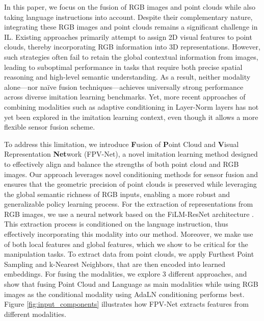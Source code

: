 In this paper, we focus on the fusion of RGB images and point clouds while also taking language instructions into account. Despite their complementary nature, integrating these RGB images and point clouds remains a significant challenge in IL. Existing approaches \cite{gervet2023act3d, shridhar2023perceiver, ze20243d} primarily attempt to assign 2D visual features to point clouds, thereby incorporating RGB information into 3D representations. However, such strategies often fail to retain the global contextual information from images, leading to suboptimal performance in tasks that require both precise spatial reasoning and high-level semantic understanding. As a result, neither modality alone—nor naïve fusion techniques—achieves universally strong performance across diverse imitation learning benchmarks. Yet, more recent approaches of combining modalities such as adaptive conditioning in Layer-Norm layers \cite{Peebles2022DiT} has not yet been explored in the imitation learning context, even though it allows a more flexible sensor fusion scheme. 



To address this limitation, we introduce \textbf{F}usion of \textbf{P}oint Cloud and \textbf{V}isual Representation \textbf{Net}work (FPV-Net), a novel imitation learning method designed to effectively align and balance the strengths of both point cloud and RGB images. Our approach leverages novel conditioning methods for sensor fusion \cite{Peebles2022DiT} and ensures that the geometric precision of point clouds is preserved while leveraging the global semantic richness of RGB inputs, enabling a more robust and generalizable policy learning process.
For the extraction of representations from RGB images, we use a neural network based on the FiLM-ResNet architecture \cite{perez2018film}. This extraction process is conditioned on the language instruction, thus effectively incorporating this modality into our method. Moreover, we make use of both local features and global features, which we show to be critical for the manipulation tasks. 
To extract data from point clouds, we apply Furthest Point Sampling \cite{eldar1994farthest} and k-Nearest Neighbors, that are then encoded into learned embeddings.  For fusing the modalities, we explore 3 different approaches, and show that fusing Point Cloud and Language as main modalities while using RGB images as the conditional modality using AdaLN conditioning \cite{Peebles2022DiT} performs best. Figure \ref{fig:input_components} illustrates how FPV-Net extracts features from different modalities.

